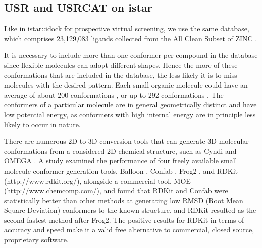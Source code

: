 \subsection{USR and USRCAT on istar}

Like in istar::idock for prospective virtual screening, we use the same database, which comprises 23,129,083 ligands collected from the All Clean Subset of ZINC \citep{532,1178}.

It is necessary to include more than one conformer per compound in the database since flexible molecules can adopt different shapes. Hence the more of these conformations that are included in the database, the less likely it is to miss molecules with the desired pattern. Each small organic molecule could have an average of about 200 conformations \citep{1332}, or up to 292 conformations \citep{1280}. The conformers of a particular molecule are in general geometrically distinct and have low potential energy, as conformers with high internal energy are in principle less likely to occur in nature.

There are numerous 2D-to-3D conversion tools that can generate 3D molecular conformations from a considered 2D chemical structure, such as Cyndi \citep{1393,1394} and OMEGA \citep{462}. A study \citep{1127} examined the performance of four freely available small molecule conformer generation tools, Balloon \citep{1442}, Confab \citep{1443}, Frog2 \citep{1444}, and RDKit (http://www.rdkit.org/), alongside a commercial tool, MOE (http://www.chemcomp.com/), and found that RDKit and Confab were statistically better than other methods at generating low RMSD (Root Mean Square Deviation) conformers to the known structure, and RDKit resulted as the second fastest method after Frog2. The positive results for RDKit in terms of accuracy and speed make it a valid free alternative to commercial, closed source, proprietary software.


